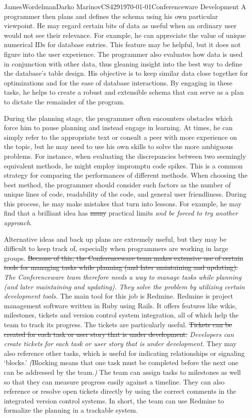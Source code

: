 \documentclass[12pt,letterpaper]{article}
\begin{document}
\begin{mla}{James}{Wordelman}{Darko Marinov}{CS429}{\today}{Conferenceware
Development}
A programmer then plans and defines the schema using his own particular viewpoint.  He may regard certain bits of data as useful when an ordinary user would not see their relevance. For example, he can appreciate the value of unique numerical IDs for database entries. This feature may be helpful, but it does not figure into the user experience.  The programmer also evaluates how data is used in conjunction with other data, thus gleaning insight into the best way to define the database's table design. His objective is to keep similar data close together for optimizations and for the ease of database interactions.  By engaging in these tasks, he helps to create a robust and extensible schema that can serve as a plan to dictate the remainder of the program.

During the planning stage, the programmer often encounters obstacles which force him to pause planning and instead engage in learning. At times, he can simply refer to the appropriate text or consult a peer with more experience on the topic, but he may need to use his own skills to solve the more ambiguous problems.  For instance, when evaluating the discrepancies between two seemingly equivalent methods, he might employ impromptu code spikes.  This is a common strategy for comparing the performances of different methods.  When choosing the best method, the programmer should consider such factors as the number of unique lines of code, readability of the code, and general user friendliness. During this process, he may make mistakes that turn into lessons. For example, he may find that a brilliant idea has \sout{many} practical limits \textit{and be forced to try another approach}.

Alternative ideas and back up plans are extremely useful, but they may be difficult to keep track of, especially when programmers are working in large groups. \sout{Because of this, the Conferenceware team makes extensive use of certain tools for managing tasks while planning (and later maintaining and updating).} \textit{The Conferenceware team therefore needs a way to manage tasks while planning (and later maintaining and updating). They solve the problem by utilizing certain development tools.}   The main tool for this job is Redmine. Redmine is project management software written in Ruby using Rails.  It offers features like wikis, milestones, tickets and version control system integration, all of which help the team to track its progress. The tickets are particularly useful.  \sout{Tickets can be created for each task or user story that is under development.} \textit{Developers can create tickets for each task or user story that is under development.} They may also reference other tasks, which is useful for indicating relationships or signaling `blocks.' \textit{(}Blocking means that one task must be completed before the next one can be addressed by the team.\textit{)} The team can assign tasks to milestones as well so that they can measure progress easily against a timeline. They can also reference or resolve open tickets directly by using the correct comments in the integrated version control systems. In short, the team can use Redmine to formalize the planning in a trackable system.  


\end{mla}
\end{document}
